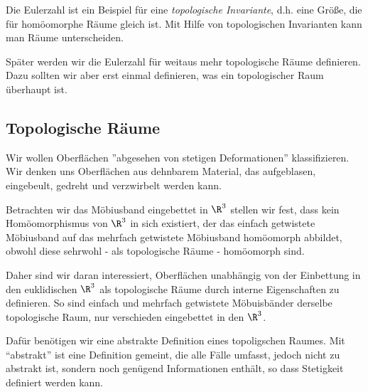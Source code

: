 Die Eulerzahl ist ein Beispiel für eine \emph{topologische Invariante}, d.h.
eine Größe, die für homöomorphe Räume gleich ist. Mit Hilfe von topologischen
Invarianten kann man Räume unterscheiden.

Später werden wir die Eulerzahl für weitaus mehr topologische Räume definieren.
Dazu sollten wir aber erst einmal definieren, was ein topologischer Raum
überhaupt ist.

\subsection{Topologische Räume}
\label{subsec:0.3}


Wir wollen Oberflächen ''abgesehen von stetigen Deformationen'' klassifizieren.
Wir denken uns Oberflächen aus dehnbarem Material, das aufgeblasen, eingebeult,
gedreht und verzwirbelt werden kann.

Betrachten wir das Möbiusband eingebettet in $\R^3$ stellen wir fest, dass  
kein Homöomorphismus von $\R^3$ in sich existiert, der das einfach getwistete
Möbiusband auf das mehrfach getwistete Möbiusband homöomorph abbildet, obwohl
diese sehrwohl - als topologische Räume - homöomorph sind.


Daher sind wir daran interessiert, Oberflächen unabhängig von der Einbettung
in den euklidischen $\R^3$ als topologische Räume durch interne Eigenschaften zu
definieren. So sind einfach und mehrfach getwistete Möbuisbänder derselbe
topologische Raum, nur verschieden eingebettet in den $\R^3$.

Dafür benötigen wir eine abstrakte Definition eines topoligschen Raumes. Mit
``abstrakt'' ist eine Definition gemeint, die alle Fälle umfasst, jedoch nicht
zu abstrakt ist, sondern noch genügend Informationen enthält, so dass
Stetigkeit definiert werden kann.

